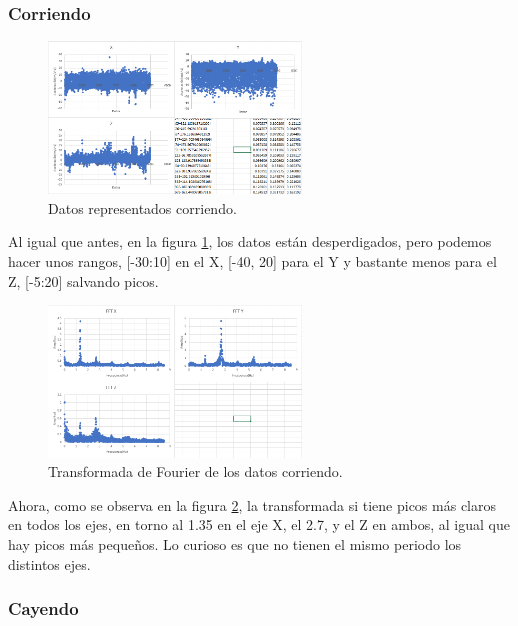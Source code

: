 \documentclass[12pt]{article}
\numberwithin{equation}{section}
\begin{document}
\subsubsection{Corriendo}
\begin{figure}[h]
    \centering
    \includegraphics[width=0.6\textwidth]{corriendoraw.png}
    \caption{Datos representados corriendo.}
    \label{fig:corriendoraw}
\end{figure}

Al igual que antes, en la figura \ref{fig:corriendoraw}, los datos están desperdigados, pero podemos hacer unos rangos, [-30:10] en el X, [-40, 20] para el Y y bastante menos para el Z, [-5:20] salvando picos.
\begin{figure}[h]
    \centering
    \includegraphics[width=0.6\textwidth]{corriendofft.png}
    \caption{Transformada de Fourier de los datos corriendo.}
    \label{fig:corriendofft}
\end{figure}

Ahora, como se observa en la figura \ref{fig:corriendofft}, la transformada si tiene picos más claros en todos los ejes, en torno al 1.35 en el eje X, el 2.7, y el Z en ambos, al igual que hay picos más pequeños. Lo curioso es que no tienen el mismo periodo los distintos ejes.

\subsubsection{Cayendo}
\end{document}
